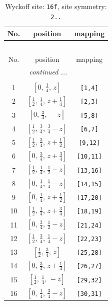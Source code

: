 \documentclass[fleqn,8pt]{jsarticle}
\begin{document}
\renewcommand{\arraystretch}{1.2}
\begin{longtable}{ccc}
\caption{Wyckoff site: {\tt 16f}, site symmetry: {\tt 2..}}
 \\
 \hline \hline
No. & position & mapping \\ \hline \endfirsthead

\multicolumn{2}{l}{\tablename\ \thetable{}} \\
 \hline \hline
No. & position & mapping \\ \hline \endhead

 \hline \hline
\multicolumn{2}{r}{\footnotesize\it continued ...} \\ \endfoot

 \hline \hline
\multicolumn{2}{r}{} \\ \endlastfoot

1 & $\left[ 0,\, \frac{1}{4},\, z \right]$ & {\tt [1,4]} \\ \hline
2 & $\left[ \frac{1}{2},\, \frac{1}{4},\, z + \frac{1}{4} \right]$ & {\tt [2,3]} \\ \hline
3 & $\left[ 0,\, \frac{3}{4},\, - z \right]$ & {\tt [5,8]} \\ \hline
4 & $\left[ \frac{1}{2},\, \frac{3}{4},\, \frac{3}{4} - z \right]$ & {\tt [6,7]} \\ \hline
5 & $\left[ \frac{1}{2},\, \frac{3}{4},\, z + \frac{1}{2} \right]$ & {\tt [9,12]} \\ \hline
6 & $\left[ 0,\, \frac{3}{4},\, z + \frac{3}{4} \right]$ & {\tt [10,11]} \\ \hline
7 & $\left[ \frac{1}{2},\, \frac{1}{4},\, \frac{1}{2} - z \right]$ & {\tt [13,16]} \\ \hline
8 & $\left[ 0,\, \frac{1}{4},\, \frac{1}{4} - z \right]$ & {\tt [14,15]} \\ \hline
9 & $\left[ 0,\, \frac{1}{4},\, z + \frac{1}{2} \right]$ & {\tt [17,20]} \\ \hline
10 & $\left[ \frac{1}{2},\, \frac{1}{4},\, z + \frac{3}{4} \right]$ & {\tt [18,19]} \\ \hline
11 & $\left[ 0,\, \frac{3}{4},\, \frac{1}{2} - z \right]$ & {\tt [21,24]} \\ \hline
12 & $\left[ \frac{1}{2},\, \frac{3}{4},\, \frac{1}{4} - z \right]$ & {\tt [22,23]} \\ \hline
13 & $\left[ \frac{1}{2},\, \frac{3}{4},\, z \right]$ & {\tt [25,28]} \\ \hline
14 & $\left[ 0,\, \frac{3}{4},\, z + \frac{1}{4} \right]$ & {\tt [26,27]} \\ \hline
15 & $\left[ \frac{1}{2},\, \frac{1}{4},\, - z \right]$ & {\tt [29,32]} \\ \hline
16 & $\left[ 0,\, \frac{1}{4},\, \frac{3}{4} - z \right]$ & {\tt [30,31]} \\
\end{longtable}
\end{document}
